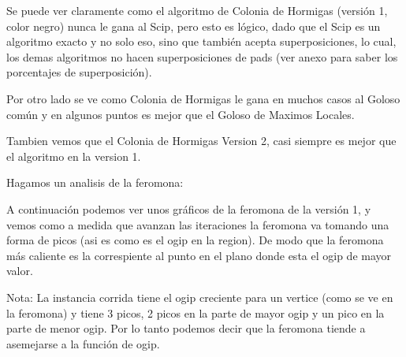 Se puede ver claramente como el algoritmo de Colonia de Hormigas (versi\'on 1, color negro) nunca le gana al Scip, pero esto es l\'ogico, dado que el Scip es un algoritmo exacto y no solo eso, sino que tambi\'en acepta superposiciones, lo cual, los demas algoritmos no hacen superposiciones de pads (ver anexo para saber los porcentajes de superposici\'on).

Por otro lado se ve como Colonia de Hormigas le gana en muchos casos al Goloso com\'un y en algunos puntos es mejor que el Goloso de Maximos Locales.

Tambien vemos que el Colonia de Hormigas Version 2, casi siempre es mejor que el algoritmo en la version 1.


\newpage

Hagamos un analisis de la feromona:

A continuaci\'on podemos ver unos gr\'aficos de la feromona de la versi\'on 1, y vemos como a medida que avanzan las iteraciones la feromona va tomando una forma de picos (asi es como es el ogip en la region). De modo que la feromona m\'as caliente es la correspiente al punto en el plano donde esta el ogip de mayor valor.

Nota: La instancia corrida tiene el ogip creciente para un vertice (como se ve en la feromona) y tiene 3 picos, 2 picos en la parte de mayor ogip y un pico en la parte de menor ogip. Por lo tanto podemos decir que la feromona tiende a asemejarse a la funci\'on de ogip.


